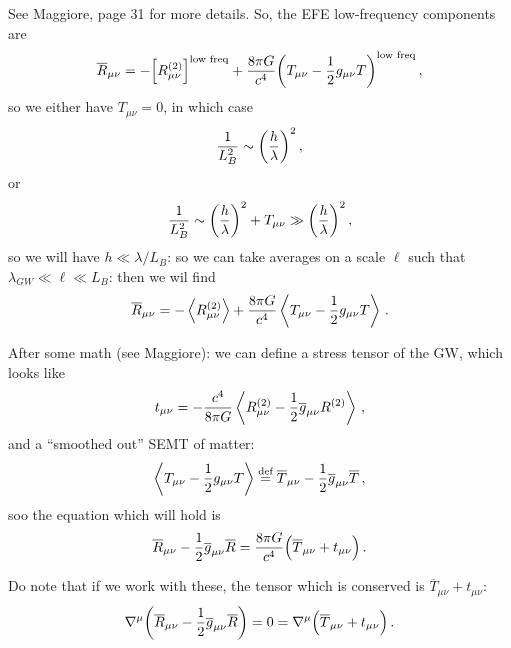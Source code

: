 \documentclass[main.tex]{subfiles}
\begin{document}
See Maggiore, page 31 for more details. 
So, the EFE low-frequency components are 
%
\begin{align}
\overline{R}_{\mu \nu } = - \qty[R^{(2)}_{\mu \nu }]^{\text{low freq}} 
+ \frac{8 \pi G}{c^{4}} \qty(T_{\mu \nu } - \frac{1}{2} g_{\mu \nu } T)^{\text{low freq}}
\,,
\end{align}
%
so we either have \(T_{\mu \nu }=0\), in which case
%
\begin{align}
\frac{1}{L_B^2} \sim \qty(\frac{h}{\lambda })^2
\,,
\end{align}
%
or 
%
\begin{align}
\frac{1}{L_B^2} \sim \qty(\frac{h}{\lambda })^2 + T_{\mu \nu } \gg \qty(\frac{h}{\lambda })^2
\,,
\end{align}
%
so we will have \(h \ll \lambda / L_B\): so we can take averages on a scale \(\ell\) such that \(\lambda_{GW} \ll \ell \ll L_B\): then we wil find 
%
\begin{align}
\overline{R}_{\mu \nu } =
- \expval{R^{(2)}_{\mu \nu }} + \frac{8 \pi G}{c^{4}} \expval{T_{\mu \nu } - \frac{1}{2} g_{\mu \nu } T} 
\,.
\end{align}

After some math (see Maggiore): we can define a stress tensor of the GW, which looks like 
%
\begin{align}
t_{\mu \nu } = - \frac{c^{4}}{8 \pi G} \expval{R^{(2)}_{\mu \nu } - \frac{1}{2} \overline{g}_{\mu \nu } R^{(2)}}
\,,
\end{align}
%
and a ``smoothed out'' SEMT of matter: 
%
\begin{align}
\expval{T_{\mu \nu } - \frac{1}{2} g_{\mu \nu } T}
\overset{\text{def}}{=}
\overline{T}_{\mu \nu } - \frac{1}{2} \overline{g}_{\mu \nu } \overline{T}
\,,
\end{align}
%
soo the equation which will hold is 
%
\begin{align}
\overline{R}_{\mu \nu } - \frac{1}{2} \overline{g}_{\mu \nu } \overline{R} = 
\frac{8 \pi G}{c^{4}} \qty(\overline{T}_{\mu \nu } + t_{\mu \nu })
\,.
\end{align}

Do note that if we work with these, the tensor which is conserved is \(\overline{T}_{\mu \nu } + t_{\mu \nu }\): 
%
\begin{align}
\nabla^{\mu } \qty(\overline{R}_{\mu \nu } - \frac{1}{2} \overline{g}_{\mu \nu }\overline{R}) = 0 = \nabla^{\mu } \qty(\overline{T}_{\mu \nu } + t_{\mu \nu })
\,.
\end{align}
\end{document}
